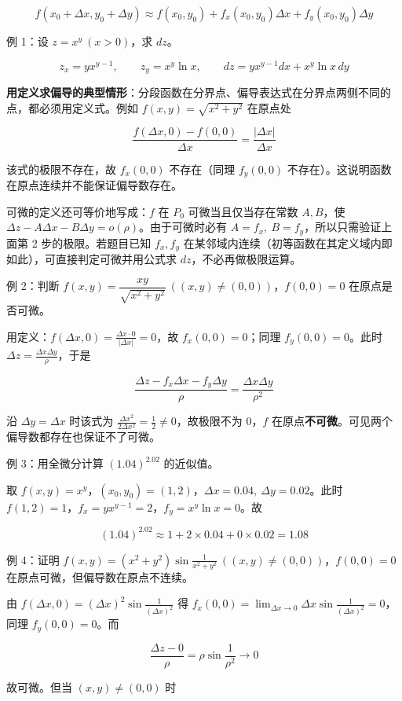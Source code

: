\documentclass[11pt,openany,UTF8]{ctexbook}
\begin{document}
\[f(x_0+\Delta x,y_0+\Delta y)\approx f(x_0,y_0)+f_x(x_0,y_0)\Delta x+f_y(x_0,y_0)\Delta y\]

例 1：设 $z=x^{y}\ (x>0)$，求 $dz$。

\[z_x=yx^{y-1},\qquad z_y=x^{y}\ln x,\qquad dz=yx^{y-1}dx+x^{y}\ln x\,dy\]

\textbf{用定义求偏导的典型情形}：分段函数在分界点、偏导表达式在分界点两侧不同的点，都必须用定义式。例如 $f(x,y)=\sqrt{x^{2}+y^{2}}$ 在原点处

\[\frac{f(\Delta x,0)-f(0,0)}{\Delta x}=\frac{\vert \Delta x\vert}{\Delta x}\]

该式的极限不存在，故 $f_x(0,0)$ 不存在（同理 $f_y(0,0)$ 不存在）。这说明函数在原点连续并不能保证偏导数存在。

可微的定义还可等价地写成：$f$ 在 $P_0$ 可微当且仅当存在常数 $A,B$，使 $\Delta z-A\Delta x-B\Delta y=o(\rho)$。由于可微时必有 $A=f_x,\ B=f_y$，所以只需验证上面第 2 步的极限。若题目已知 $f_x,f_y$ 在某邻域内连续（初等函数在其定义域内即如此），可直接判定可微并用公式求 $dz$，不必再做极限运算。

例 2：判断 $f(x,y)=\dfrac{xy}{\sqrt{x^{2}+y^{2}}}\ ((x,y)\ne(0,0))$，$f(0,0)=0$ 在原点是否可微。

用定义：$f(\Delta x,0)=\frac{\Delta x\cdot 0}{\vert \Delta x\vert}=0$，故 $f_x(0,0)=0$；同理 $f_y(0,0)=0$。此时 $\Delta z=\frac{\Delta x\Delta y}{\rho}$，于是

\[\frac{\Delta z-f_x\Delta x-f_y\Delta y}{\rho}=\frac{\Delta x\Delta y}{\rho^{2}}\]

沿 $\Delta y=\Delta x$ 时该式为 $\frac{\Delta x^{2}}{2\Delta x^{2}}=\frac12\ne 0$，故极限不为 $0$，$f$ 在原点\textbf{不可微}。可见两个偏导数都存在也保证不了可微。

例 3：用全微分计算 $(1.04)^{2.02}$ 的近似值。

取 $f(x,y)=x^{y}$，$(x_0,y_0)=(1,2)$，$\Delta x=0.04,\ \Delta y=0.02$。此时 $f(1,2)=1$，$f_x=yx^{y-1}=2$，$f_y=x^{y}\ln x=0$。故

\[(1.04)^{2.02}\approx 1+2\times 0.04+0\times 0.02=1.08\]

例 4：证明 $f(x,y)=(x^{2}+y^{2})\sin\frac{1}{x^{2}+y^{2}}\ ((x,y)\ne(0,0))$，$f(0,0)=0$ 在原点可微，但偏导数在原点不连续。

由 $f(\Delta x,0)=(\Delta x)^{2}\sin\frac{1}{(\Delta x)^{2}}$ 得 $f_x(0,0)=\lim_{\Delta x\to 0}\Delta x\sin\frac{1}{(\Delta x)^{2}}=0$，同理 $f_y(0,0)=0$。而

\[\frac{\Delta z-0}{\rho}=\rho\sin\frac{1}{\rho^{2}}\to 0\]

故可微。但当 $(x,y)\ne(0,0)$ 时
\end{document}
